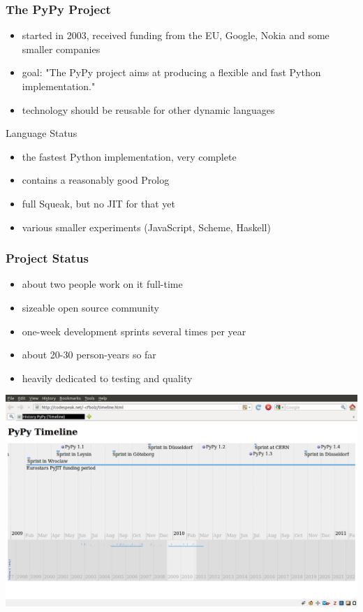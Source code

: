 \documentclass[utf8x]{beamer}
\begin{document}
\begin{frame}
  \frametitle{The PyPy Project}
  \begin{itemize}
      \item started in 2003, received funding from the EU, Google, Nokia and some smaller companies
      \item goal: "The PyPy project aims at producing a flexible and fast Python implementation."
      \item technology should be reusable for other dynamic languages
  \end{itemize}
  \pause
  \begin{block}{Language Status}
    \begin{itemize}
        \item the fastest Python implementation, very complete
        \item contains a reasonably good Prolog
        \item full Squeak, but no JIT for that yet
        \item various smaller experiments (JavaScript, Scheme, Haskell)
    \end{itemize}
      
  \end{block}
\end{frame}

\begin{frame}
  \frametitle{Project Status}
  \begin{itemize}
      \item about two people work on it full-time
      \item sizeable open source community
      \item one-week development sprints several times per year
      \item about 20-30 person-years so far
      \item heavily dedicated to testing and quality
  \end{itemize}
\end{frame}


\begin{frame}[plain]
  \includegraphics[scale=0.25]{figures/timeline.png}
\end{frame}
\end{document}
